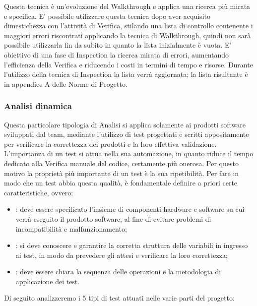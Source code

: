 \label{3.1.2}
Questa tecnica è un'evoluzione del Walkthrough e applica una ricerca più mirata e specifica. E' possibile utilizzare questa tecnica dopo aver acquisito dimestichezza con l'attività di Verifica, stilando una lista di controllo contenente i maggiori errori riscontrati applicando la tecnica di Walkthrough, quindi non sarà possibile utilizzarla fin da subito in quanto la lista inizialmente è vuota.
E' obiettivo di una fase di Inspection la ricerca mirata di errori, aumentando l'efficienza della Verifica e riducendo i costi in termini di tempo e risorse.
Durante l'utilizzo della tecnica di Inspection la lista verrà aggiornata; la lista risultante è in appendice A delle Norme di Progetto.

\subsubsection{Analisi dinamica}
\label{3.2}
Questa particolare tipologia di Analisi si applica solamente ai prodotti software sviluppati dal team, mediante l'utilizzo di test progettati e scritti appositamente per verificare la correttezza dei prodotti e la loro effettiva validazione.
L'importanza di un test si attua nella sua automazione, in quanto riduce il tempo dedicato alla Verifica manuale del codice, certamente più onerosa. Per questo motivo la proprietà più importante di un test è la sua ripetibilità.
Per fare in modo che un test abbia questa qualità, è fondamentale definire a priori certe caratteristiche, ovvero:
\begin{itemize}
\item {}: deve essere specificato l'insieme di componenti hardware e software su cui verrà eseguito il prodotto software, al fine di evitare problemi di incompatibilità e malfunzionamento;
\item {}: si deve conoscere e garantire la corretta struttura delle variabili in ingresso ai test, in modo da prevedere gli  attesi e verificare la loro correttezza;
\item {}: deve essere chiara la sequenza delle operazioni e la metodologia di applicazione dei test.
\end{itemize}
Di seguito analizzeremo i 5 tipi di test attuati nelle varie parti del progetto:
